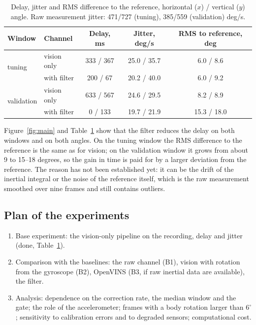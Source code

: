 \documentclass{article}
\begin{document}
\begin{table}[t]
    \centering
    \caption{Delay, jitter and RMS difference to the reference, horizontal ($x$) / vertical ($y$) angle. Raw measurement jitter: 471/727 (tuning), 385/559 (validation) deg/s.}
    \label{tab:results}
    \begin{tabular}{llccc}
        \toprule
        Window & Channel & Delay, ms & Jitter, deg/s & RMS to reference, deg \\
        \midrule
        \multirow{2}{*}{tuning}     & vision only & 333 / 367 & 25.0 / 35.7 & 6.0 / 8.6 \\
                                    & with filter & 200 / 67  & 20.2 / 40.0 & 6.0 / 9.2 \\
        \midrule
        \multirow{2}{*}{validation} & vision only & 633 / 567 & 24.6 / 29.5 & 8.2 / 8.9 \\
                                    & with filter & 0 / 133   & 19.7 / 21.9 & 15.3 / 18.0 \\
        \bottomrule
    \end{tabular}
\end{table}

Figure~\ref{fig:main} and Table~\ref{tab:results} show that the filter reduces the delay on both windows and on both angles. On the tuning window the RMS difference to the reference is the same as for vision; on the validation window it grows from about 9 to 15--18 degrees, so the gain in time is paid for by a larger deviation from the reference. The reason has not been established yet: it can be the drift of the inertial integral or the noise of the reference itself, which is the raw measurement smoothed over nine frames and still contains outliers.

\subsection{Plan of the experiments}\label{sec:plan}

\begin{enumerate}
    \item Base experiment: the vision-only pipeline on the recording, delay and jitter (done, Table~\ref{tab:results}).
    \item Comparison with the baselines: the raw channel (B1), vision with rotation from the gyroscope (B2), OpenVINS (B3, if raw inertial data are available), the filter.
    \item Analysis: dependence on the correction rate, the median window and the gate; the role of the accelerometer; frames with a body rotation larger than $6^\circ$; sensitivity to calibration errors and to degraded sensors; computational cost.
\end{enumerate}
\end{document}
